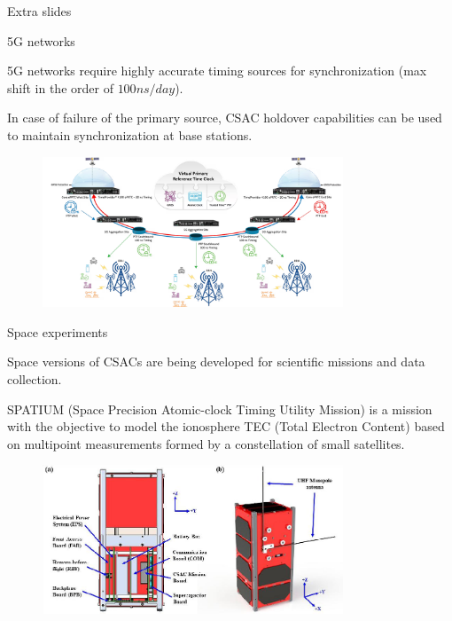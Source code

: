 \begin{frame}[standout]
    Extra slides
\end{frame}



\begin{frame}{5G networks}

    5G networks require highly accurate timing sources for synchronization (max shift in the order of $100 ns/day$).

    In case of failure of the primary source, CSAC holdover capabilities can be used to maintain synchronization at base stations.

    \begin{figure}
        \centering
        \includegraphics[width=0.8\textwidth]{img/5G.png}
    \end{figure}

\end{frame}



\begin{frame}{Space experiments}

    Space versions of CSACs are being developed for scientific missions and data collection.

    SPATIUM (Space Precision Atomic-clock Timing Utility Mission) is a mission with the objective to model the ionosphere TEC (Total Electron Content) based on multipoint measurements formed by a constellation of small satellites.

    \begin{figure}
        \centering
        \includegraphics[width=0.8\textwidth]{img/SPATIUM.png}
    \end{figure}

\end{frame}